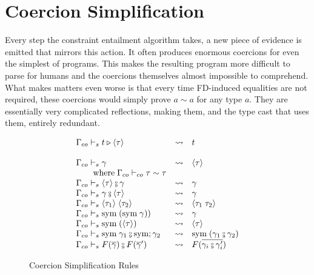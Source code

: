 \chapter{Coercion Simplification}
\label{cha:co-simpl}

Every step the constraint entailment algorithm takes, a new piece of evidence is
emitted that mirrors this action. It often produces enormous coercions for even
the simplest of programs. This makes the resulting program more difficult to
parse for humans and the coercions themselves almost impossible to comprehend.
What makes matters even worse is that every time FD-induced equalities are not
required, these coercions would simply prove $a \sim a$ for any type $a$. They
are essentially very complicated reflections, making them, and the type cast
that uses them, entirely redundant.

\begin{figure}
\[
\begin{array}{l c l}
\Gamma_{co} \vdash_s t \triangleright \langle \tau \rangle &\rightsquigarrow& t\\
\\
\Gamma_{co} \vdash_s \gamma &\rightsquigarrow& \langle \tau \rangle\\
\where \Gamma_{co} \vdash_{co} \tau \sim \tau
\\
\Gamma_{co} \vdash_s \langle \tau \rangle \fctrans \gamma &\rightsquigarrow& \gamma
\\
\Gamma_{co} \vdash_s \gamma \fctrans \langle \tau \rangle &\rightsquigarrow& \gamma
\\
\Gamma_{co} \vdash_s \langle \tau_1 \rangle \; \langle \tau_2 \rangle
&\rightsquigarrow& \langle \tau_1 \; \tau_2 \rangle
\\
\Gamma_{co} \vdash_s \text{sym} \; (\text{sym} \; \gamma)) &\rightsquigarrow& \gamma
\\
\Gamma_{co} \vdash_s \text{sym} \; (\langle \tau \rangle) &\rightsquigarrow& \langle \tau \rangle
\\
\Gamma_{co} \vdash_s \text{sym} \; \gamma_1 \fctrans \text{sym} ; \gamma_2
&\rightsquigarrow& \text{sym} \; (\gamma_1 \fctrans \gamma_2)
\\
\Gamma_{co} \vdash_s F(\overline{\gamma}) \fctrans F(\overline{\gamma}')
&\rightsquigarrow& F(\overline{\gamma_i \fctrans \gamma_i'})
\end{array}
\]
\caption{Coercion Simplification Rules}
\label{fig:co-simpl}
\end{figure}

